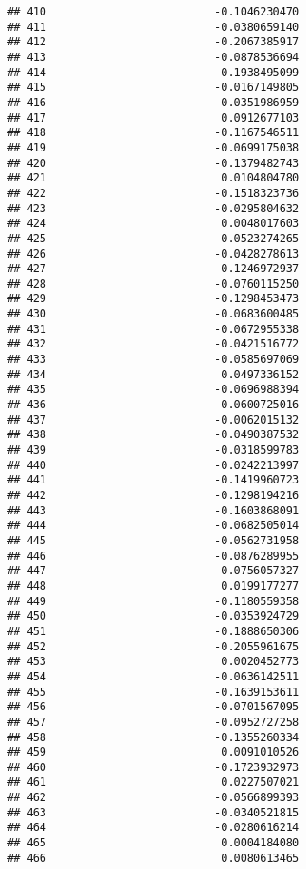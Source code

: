 \documentclass[
]{article}
\begin{document}
\begin{verbatim}
## 410                          -0.1046230470
## 411                          -0.0380659140
## 412                          -0.2067385917
## 413                          -0.0878536694
## 414                          -0.1938495099
## 415                          -0.0167149805
## 416                           0.0351986959
## 417                           0.0912677103
## 418                          -0.1167546511
## 419                          -0.0699175038
## 420                          -0.1379482743
## 421                           0.0104804780
## 422                          -0.1518323736
## 423                          -0.0295804632
## 424                           0.0048017603
## 425                           0.0523274265
## 426                          -0.0428278613
## 427                          -0.1246972937
## 428                          -0.0760115250
## 429                          -0.1298453473
## 430                          -0.0683600485
## 431                          -0.0672955338
## 432                          -0.0421516772
## 433                          -0.0585697069
## 434                           0.0497336152
## 435                          -0.0696988394
## 436                          -0.0600725016
## 437                          -0.0062015132
## 438                          -0.0490387532
## 439                          -0.0318599783
## 440                          -0.0242213997
## 441                          -0.1419960723
## 442                          -0.1298194216
## 443                          -0.1603868091
## 444                          -0.0682505014
## 445                          -0.0562731958
## 446                          -0.0876289955
## 447                           0.0756057327
## 448                           0.0199177277
## 449                          -0.1180559358
## 450                          -0.0353924729
## 451                          -0.1888650306
## 452                          -0.2055961675
## 453                           0.0020452773
## 454                          -0.0636142511
## 455                          -0.1639153611
## 456                          -0.0701567095
## 457                          -0.0952727258
## 458                          -0.1355260334
## 459                           0.0091010526
## 460                          -0.1723932973
## 461                           0.0227507021
## 462                          -0.0566899393
## 463                          -0.0340521815
## 464                          -0.0280616214
## 465                           0.0004184080
## 466                           0.0080613465

\end{verbatim}
\end{document}
